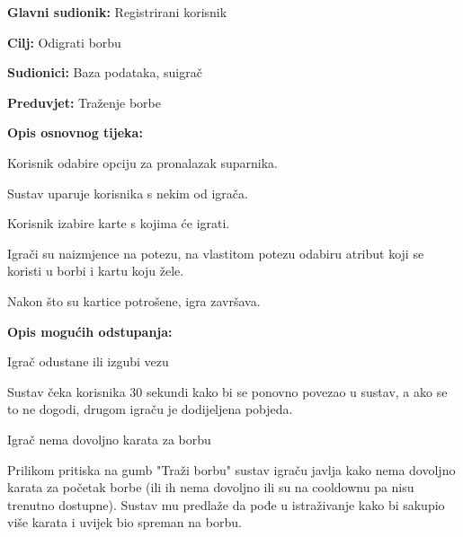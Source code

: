 				\noindent {}
				\begin{packed_item}
					
					\item \textbf{Glavni sudionik: }Registrirani korisnik
					\item  \textbf{Cilj:} Odigrati borbu
					\item  \textbf{Sudionici:} Baza podataka, suigrač
					\item  \textbf{Preduvjet:} Traženje borbe
					\item  \textbf{Opis osnovnog tijeka:}
					
					\item[] \begin{packed_enum}
						
						\item Korisnik odabire opciju za pronalazak suparnika.
						\item Sustav uparuje korisnika s nekim od igrača.
						\item Korisnik izabire karte s kojima će igrati.
						\item Igrači su naizmjence na potezu, na vlastitom potezu odabiru atribut koji se koristi u borbi i kartu koju žele.
						\item Nakon što su kartice potrošene, igra završava.
					\end{packed_enum}
					
					\item  \textbf{Opis mogućih odstupanja:}
					
					\item[] \begin{packed_item}
						
						\item[1.a] Igrač odustane ili izgubi vezu
						\item[] \begin{packed_enum}
							
							\item  Sustav čeka korisnika 30 sekundi kako bi se ponovno povezao u sustav, a ako se to ne dogodi, drugom igraču je dodijeljena pobjeda.
							
						\end{packed_enum}
						\item[2.a] Igrač nema dovoljno karata za borbu
						\item[] \begin{packed_enum}
							
							\item  Prilikom pritiska na gumb "Traži borbu" sustav igraču javlja kako nema dovoljno karata za početak borbe (ili ih nema dovoljno ili su na cooldownu pa nisu trenutno dostupne). Sustav mu predlaže da pođe u istraživanje kako bi sakupio više karata i uvijek bio spreman na borbu.
							
						\end{packed_enum}
						
					\end{packed_item}
				\end{packed_item}
				
